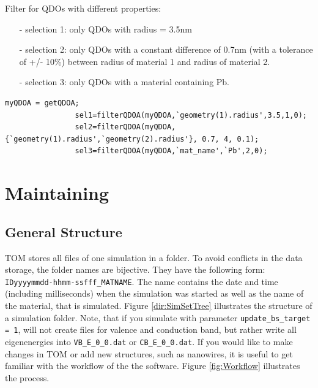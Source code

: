 			\begin{EXAMPLE}
				Filter for QDOs with different properties:
				\begin{itemize}
				\item[-] selection 1: only QDOs with radius = 3.5nm
				\item[-] selection 2: only QDOs with a constant difference of 0.7nm (with a tolerance of +/- 10\%) between radius of material 1 and radius of material 2.
				\item[-] selection 3: only QDOs with a material containing Pb.
				\end{itemize}
				\begin{lstlisting}[frame = none]
				myQDOA = getQDOA;
				sel1=filterQDOA(myQDOA,`geometry(1).radius',3.5,1,0);
				sel2=filterQDOA(myQDOA,{`geometry(1).radius',`geometry(2).radius'}, 0.7, 4, 0.1);
				sel3=filterQDOA(myQDOA,`mat_name',`Pb',2,0); \end{lstlisting}
			\end{EXAMPLE}
				 

	
	\section{Maintaining \software}
		\subsection{General Structure} \label{sec:SoftwareStructure}
			\gls{TOM} stores all files of one simulation in a folder. To avoid conflicts in the data storage, the folder names are bijective. They
			have the following form: \lstinline{IDyyyymmdd-hhmm-ssfff_MATNAME}. The name contains the date and time (including milliseconds)
			when the simulation was started as well as the name of the material, that is simulated. Figure \ref{dir:SimSetTree} illustrates
			the structure of a simulation folder. Note, that if you simulate with parameter \lstinline{update_bs_target = 1}, \omen will
			not create files for valence and conduction band, but rather write all eigenenergies into \lstinline{VB_E_0_0.dat} or
			\lstinline{CB_E_0_0.dat}.
			If you would like to make changes in \gls{TOM} or add new structures, such as nanowires, it is useful to get familiar with the
			workflow of the the software. Figure \ref{fig:Workflow} illustrates the process.
		
